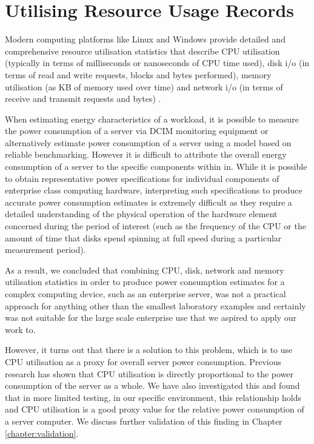 \section{Utilising Resource Usage Records}

Modern computing platforms like Linux and Windows provide detailed and comprehensive resource utilisation statistics that describe CPU utilisation (typically in terms of milliseconds or nanoseconds of CPU time used), disk i/o (in terms of read and write requests, blocks and bytes performed), memory utilisation (as KB of memory used over time) and network i/o (in terms of receive and transmit requests and bytes) \cite{unix_sar_command, windows_performance_monitor}.

When estimating energy characteristics of a workload, it is possible to measure the power consumption of a server via DCIM monitoring equipment or alternatively estimate power consumption of a server using a model based on reliable benchmarking.  However it is difficult to attribute the overall energy consumption of a server to the specific components within in.  While it is possible to obtain representative power specifications \cite{hitachi_drive_data_sheet} for individual components of enterprise class computing hardware, interpreting such specifications to produce accurate power consumption estimates is extremely difficult as they require a detailed understanding of the physical operation of the hardware element concerned during the period of interest (such as the frequency of the CPU or the amount of time that disks spend spinning at full speed during a particular measurement period).

As a result, we concluded that combining CPU, disk, network and memory utilisation statistics in order to produce power consumption estimates for a complex computing device, such as an enterprise server, was not a practical approach for anything other than the smallest laboratory examples and certainly was not suitable for the large scale enterprise use that we aspired to apply our work to.

However, it turns out that there is a solution to this problem, which is to use CPU utilisation as a proxy for overall server power consumption.  Previous research \cite{bashroush2018_hardwarerefresh} has shown that CPU utilisation is directly proportional to the power consumption of the server as a whole.  We have also investigated this and found that in more limited testing, in our specific environment, this relationship holds and CPU utilisation is a good proxy value for the relative power consumption of a server computer.  We discuss further validation of this finding in Chapter \ref{chapter:validation}.

